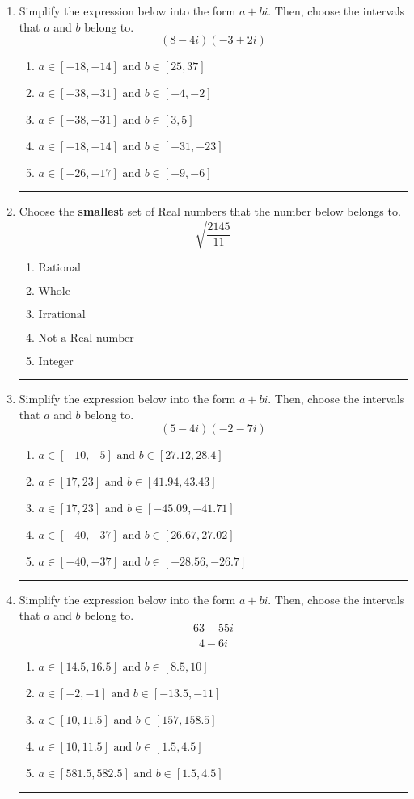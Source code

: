 \documentclass[14pt]{extbook}
\newcommand{\litem}[1]{\item#1\hspace*{-1cm}\rule{\textwidth}{0.4pt}}
\begin{document}
\begin{enumerate}
\litem{
Simplify the expression below into the form $a+bi$. Then, choose the intervals that $a$ and $b$ belong to.\[ (8 - 4 i)(-3 + 2 i) \]\begin{enumerate}[label=\Alph*.]
\item \( a \in [-18, -14] \text{ and } b \in [25, 37] \)
\item \( a \in [-38, -31] \text{ and } b \in [-4, -2] \)
\item \( a \in [-38, -31] \text{ and } b \in [3, 5] \)
\item \( a \in [-18, -14] \text{ and } b \in [-31, -23] \)
\item \( a \in [-26, -17] \text{ and } b \in [-9, -6] \)

\end{enumerate} }
\litem{
Choose the \textbf{smallest} set of Real numbers that the number below belongs to.\[ \sqrt{\frac{2145}{11}} \]\begin{enumerate}[label=\Alph*.]
\item \( \text{Rational} \)
\item \( \text{Whole} \)
\item \( \text{Irrational} \)
\item \( \text{Not a Real number} \)
\item \( \text{Integer} \)

\end{enumerate} }
\litem{
Simplify the expression below into the form $a+bi$. Then, choose the intervals that $a$ and $b$ belong to.\[ (5 - 4 i)(-2 - 7 i) \]\begin{enumerate}[label=\Alph*.]
\item \( a \in [-10, -5] \text{ and } b \in [27.12, 28.4] \)
\item \( a \in [17, 23] \text{ and } b \in [41.94, 43.43] \)
\item \( a \in [17, 23] \text{ and } b \in [-45.09, -41.71] \)
\item \( a \in [-40, -37] \text{ and } b \in [26.67, 27.02] \)
\item \( a \in [-40, -37] \text{ and } b \in [-28.56, -26.7] \)

\end{enumerate} }
\litem{
Simplify the expression below into the form $a+bi$. Then, choose the intervals that $a$ and $b$ belong to.\[ \frac{63 - 55 i}{4 - 6 i} \]\begin{enumerate}[label=\Alph*.]
\item \( a \in [14.5, 16.5] \text{ and } b \in [8.5, 10] \)
\item \( a \in [-2, -1] \text{ and } b \in [-13.5, -11] \)
\item \( a \in [10, 11.5] \text{ and } b \in [157, 158.5] \)
\item \( a \in [10, 11.5] \text{ and } b \in [1.5, 4.5] \)
\item \( a \in [581.5, 582.5] \text{ and } b \in [1.5, 4.5] \)


\end{enumerate}}
\end{enumerate}
\end{document}
